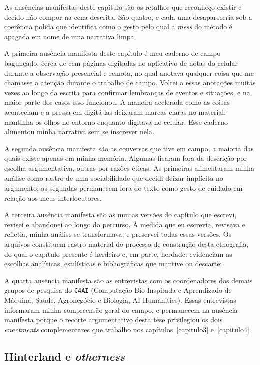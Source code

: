 As ausências manifestas deste capítulo são os retalhos que reconheço existir e decido não compor na cena descrita. São quatro, e cada uma desapareceria sob a coerência polida que \textcite{Law2004After} identifica como o gesto pelo qual a \textit{mess} do método é apagada em nome de uma narrativa limpa.

A primeira ausência manifesta deste capítulo é meu caderno de campo bagunçado, cerca de cem páginas digitadas no aplicativo de notas do celular durante a observação presencial e remota, no qual anotava qualquer coisa que me chamasse a atenção durante o trabalho de campo. Voltei a essas anotações muitas vezes ao longo da escrita para confirmar lembranças de eventos e situações, e na maior parte dos casos isso funcionou. A maneira acelerada como as coisas aconteciam e a pressa em digitá-las deixaram marcas claras no material; mantinha os olhos no entorno enquanto digitava no celular. Esse caderno alimentou minha narrativa sem se inscrever nela.

A segunda ausência manifesta são as conversas que tive em campo, a maioria das quais existe apenas em minha memória. Algumas ficaram fora da descrição por escolha argumentativa, outras por razões éticas. As primeiras alimentaram minha análise como rastro de uma sociabilidade que decidi deixar implícita no argumento; as segundas permanecem fora do texto como gesto de cuidado em relação aos meus interlocutores.

A terceira ausência manifesta são as muitas versões do capítulo que escrevi, revisei e abandonei ao longo do percurso. À medida que eu escrevia, revisava e refletia, minha análise se transformava, e preservei todas essas versões. Os arquivos constituem rastro material do processo de construção desta etnografia, do qual o capítulo presente é herdeiro e, em parte, herdade: evidenciam as escolhas analíticas, estilísticas e bibliográficas que mantive ou descartei.

A quarta ausência manifesta são as entrevistas com os coordenadores dos demais grupos de pesquisa do \texttt{C4AI} (Computação Bio-Inspirada e Aprendizado de Máquina, Saúde, Agronegócio e Biologia, AI Humanities). Essas entrevistas informaram minha compreensão geral do campo, e permanecem na ausência manifesta porque o recorte argumentativo desta tese privilegiou os dois \textit{enactments} complementares que trabalho nos capítulos~\ref{capitulo3} e~\ref{capitulo4}.

\subsection{Hinterland e \textit{otherness}}

